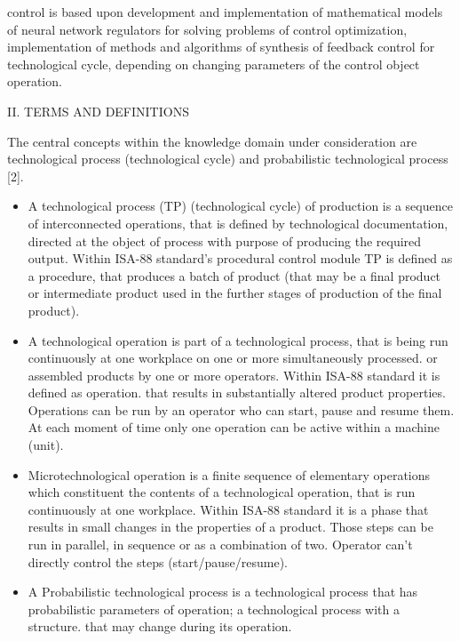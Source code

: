 \documentclass{article}
\begin{document}
\begin{multicols}{2}
control is based upon development and implementation
of mathematical models of neural network regulators for
solving problems of control optimization, implementation
of methods and algorithms of synthesis of feedback
control for technological cycle, depending on changing
parameters of the control object operation.
\begin{center}
    II. TERMS AND DEFINITIONS \\
\end{center}
\par The central concepts within the knowledge domain under consideration are technological process (technological
cycle) and probabilistic technological process [2].
\begin{itemize}
    \renewcommand{\labelitemi}{ 1)}
    \item A technological process (TP) (technological cycle) of production is a sequence of interconnected operations, that is defined by technological documentation, directed at the object of process with purpose of producing the required output. Within ISA-88 standard’s procedural control module TP is defined as a procedure, that produces a batch of product (that may be a final product or intermediate product used in the further stages of production of the final product).
    \renewcommand{\labelitemi}{2)}
    \item A technological operation is part of a technological process, that is being run continuously at one workplace on one or more simultaneously processed. or assembled products by one or more operators. Within ISA-88 standard it is defined as operation. that results in substantially altered product properties. Operations can be run by an operator who can start, pause and resume them. At each moment of time only one operation can be active within a machine (unit).
    \renewcommand{\labelitemi}{3)}
    \item Microtechnological operation is a finite sequence of elementary operations which constituent the contents of a technological operation, that is run continuously at one workplace. Within ISA-88 standard it is a phase that results in small changes in the properties of a product. Those steps can be run in parallel, in sequence or as a combination of two. Operator can’t directly control the steps (start/pause/resume).
    \renewcommand{\labelitemi}{4)}
    \item A Probabilistic technological process is a technological process that has probabilistic parameters of operation; a technological process with a structure. that may change during its operation.
\end{itemize}
\end{multicols}
\end{document}
